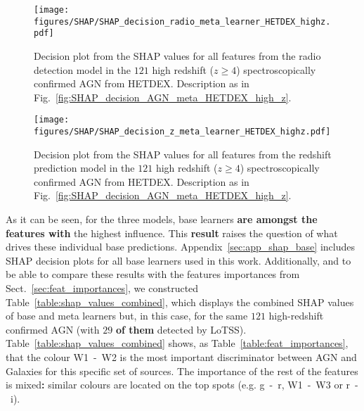 \documentclass{aa}
\begin{document}
\begin{figure}
   \centering
   \begin{minipage}{0.75\columnwidth}
   \texttt{[image: figures/SHAP/SHAP\_decision\_radio\_meta\_learner\_HETDEX\_highz.pdf]}
   \end{minipage}
   \caption{Decision plot from the SHAP values for all features from the radio detection model in the $121$ high redshift ($z \geq 4$) spectroscopically confirmed AGN from HETDEX. Description as in Fig.~\ref{fig:SHAP_decision_AGN_meta_HETDEX_high_z}.}
   \label{fig:SHAP_decision_radio_meta_HETDEX_high_z}
\end{figure}

\begin{figure}
   \centering
   \begin{minipage}{0.85\columnwidth}
   \texttt{[image: figures/SHAP/SHAP\_decision\_z\_meta\_learner\_HETDEX\_highz.pdf]}
   \end{minipage}
   \caption{Decision plot from the SHAP values for all features from the redshift prediction model in the $121$ high redshift ($z \geq 4$) spectroscopically confirmed AGN from HETDEX. Description as in Fig.~\ref{fig:SHAP_decision_AGN_meta_HETDEX_high_z}.}
   \label{fig:SHAP_decision_z_meta_HETDEX_high_z}
\end{figure}

As it can be seen, for the three models, base learners \textbf{are amongst the features with} the highest influence. This \textbf{result} raises the question of what drives these individual base predictions. Appendix~\ref{sec:app_shap_base} includes SHAP decision plots for all base learners used in this work. Additionally, and to be able to compare these results with the features importances from Sect.~\ref{sec:feat_importances}, we constructed Table~\ref{table:shap_values_combined}, which displays the combined SHAP values of base and meta learners but, in this case, for the same $121$ high-redshift confirmed AGN (with $29$ \textbf{of them} detected by LoTSS). Table~\ref{table:shap_values_combined} shows, as Table~\ref{table:feat_importances}, that the colour W1~-~W2 is the most important discriminator between AGN and Galaxies for this specific set of sources. The importance of the rest of the features is mixed\textbf{:} similar colours are located on the top spots (e.g. g~-~r, W1~-~W3 or r~-~i).
\end{document}
